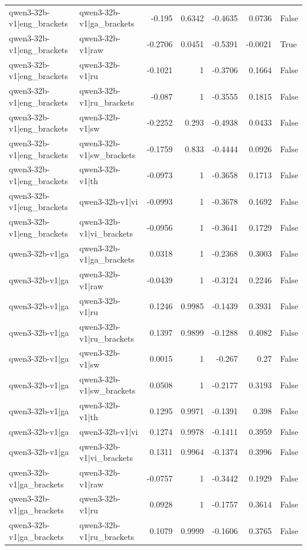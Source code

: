 \begin{table}
\begin{tabular}{l l r r r r l}
qwen3-32b-v1|eng_brackets & qwen3-32b-v1|ga_brackets & -0.195 & 0.6342 & -0.4635 & 0.0736 & False \\
qwen3-32b-v1|eng_brackets & qwen3-32b-v1|raw & -0.2706 & 0.0451 & -0.5391 & -0.0021 & True \\
qwen3-32b-v1|eng_brackets & qwen3-32b-v1|ru & -0.1021 & 1 & -0.3706 & 0.1664 & False \\
qwen3-32b-v1|eng_brackets & qwen3-32b-v1|ru_brackets & -0.087 & 1 & -0.3555 & 0.1815 & False \\
qwen3-32b-v1|eng_brackets & qwen3-32b-v1|sw & -0.2252 & 0.293 & -0.4938 & 0.0433 & False \\
qwen3-32b-v1|eng_brackets & qwen3-32b-v1|sw_brackets & -0.1759 & 0.833 & -0.4444 & 0.0926 & False \\
qwen3-32b-v1|eng_brackets & qwen3-32b-v1|th & -0.0973 & 1 & -0.3658 & 0.1713 & False \\
qwen3-32b-v1|eng_brackets & qwen3-32b-v1|vi & -0.0993 & 1 & -0.3678 & 0.1692 & False \\
qwen3-32b-v1|eng_brackets & qwen3-32b-v1|vi_brackets & -0.0956 & 1 & -0.3641 & 0.1729 & False \\
qwen3-32b-v1|ga & qwen3-32b-v1|ga_brackets & 0.0318 & 1 & -0.2368 & 0.3003 & False \\
qwen3-32b-v1|ga & qwen3-32b-v1|raw & -0.0439 & 1 & -0.3124 & 0.2246 & False \\
qwen3-32b-v1|ga & qwen3-32b-v1|ru & 0.1246 & 0.9985 & -0.1439 & 0.3931 & False \\
qwen3-32b-v1|ga & qwen3-32b-v1|ru_brackets & 0.1397 & 0.9899 & -0.1288 & 0.4082 & False \\
qwen3-32b-v1|ga & qwen3-32b-v1|sw & 0.0015 & 1 & -0.267 & 0.27 & False \\
qwen3-32b-v1|ga & qwen3-32b-v1|sw_brackets & 0.0508 & 1 & -0.2177 & 0.3193 & False \\
qwen3-32b-v1|ga & qwen3-32b-v1|th & 0.1295 & 0.9971 & -0.1391 & 0.398 & False \\
qwen3-32b-v1|ga & qwen3-32b-v1|vi & 0.1274 & 0.9978 & -0.1411 & 0.3959 & False \\
qwen3-32b-v1|ga & qwen3-32b-v1|vi_brackets & 0.1311 & 0.9964 & -0.1374 & 0.3996 & False \\
qwen3-32b-v1|ga_brackets & qwen3-32b-v1|raw & -0.0757 & 1 & -0.3442 & 0.1929 & False \\
qwen3-32b-v1|ga_brackets & qwen3-32b-v1|ru & 0.0928 & 1 & -0.1757 & 0.3614 & False \\
qwen3-32b-v1|ga_brackets & qwen3-32b-v1|ru_brackets & 0.1079 & 0.9999 & -0.1606 & 0.3765 & False \\

\end{tabular}
\end{table}
